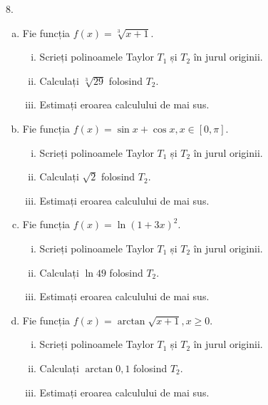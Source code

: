 8. \begin{enumerate}[(a)]
    \item Fie funcția $ f(x) = \sqrt[3]{x + 1} $.
        \begin{enumerate}[(i)]
            \item Scrieți polinoamele Taylor $ T_1 $ și $ T_2 $ în jurul
                originii.
            \item Calculați $ \sqrt[3]{29} $ folosind $ T_2 $.
            \item Estimați eroarea calculului de mai sus.
        \end{enumerate}
    \item Fie funcția $ f(x) = \sin x + \cos x, x \in [0, \pi] $. 
        \begin{enumerate}[(i)]
            \item Scrieți polinoamele Taylor $ T_1 $ și $ T_2 $ în jurul
                originii.
            \item Calculați $ \sqrt{2} $ folosind $ T_2 $.
            \item Estimați eroarea calculului de mai sus.
        \end{enumerate}
    \item Fie funcția $ f(x) = \ln(1 + 3x)^2 $.
        \begin{enumerate}[(i)]
            \item Scrieți polinoamele Taylor $ T_1 $ și $ T_2 $ în jurul originii.
            \item Calculați $ \ln 49 $ folosind $ T_2 $.
            \item Estimați eroarea calculului de mai sus.
        \end{enumerate}
    \item Fie funcția $ f(x) = \arctan \sqrt{x + 1}, x \geq 0 $.
        \begin{enumerate}[(i)]
            \item Scrieți polinoamele Taylor $ T_1 $ și $ T_2 $ în jurul originii.
            \item Calculați $ \arctan 0,1 $ folosind $ T_2 $.
            \item Estimați eroarea calculului de mai sus.
        \end{enumerate}
\end{enumerate}


